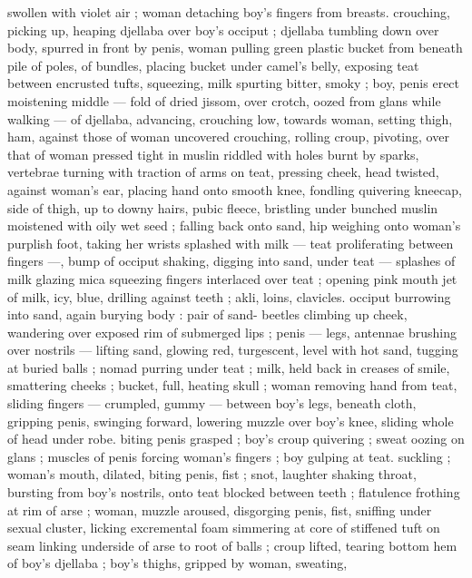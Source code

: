 swollen with violet air ; woman detaching boy's fingers from breasts. 
crouching, picking up, heaping djellaba over boy's occiput ; djellaba 
tumbling down over body, spurred in front by penis, woman pulling 
green plastic bucket from beneath pile of poles, of bundles, placing 
bucket under camel's belly, exposing teat between encrusted tufts, 
squeezing, milk spurting bitter, smoky ; boy, penis erect moistening 
middle --- fold of dried jissom, over crotch, oozed from glans while 
walking --- of djellaba, advancing, crouching low, towards woman, 
setting thigh, ham, against those of woman uncovered crouching, 
rolling croup, pivoting, over that of woman pressed tight in muslin 
riddled with holes burnt by sparks, vertebrae turning with traction of 
arms on teat, pressing cheek, head twisted, against woman's ear, 
placing hand onto smooth knee, fondling quivering kneecap, side of 
thigh, up to downy hairs, pubic fleece, bristling under bunched 
muslin moistened with oily wet seed ; falling back onto sand, hip 
weighing onto woman's purplish foot, taking her wrists splashed with 
milk --- teat proliferating between fingers ---, bump of occiput 
shaking, digging into sand, under teat --- splashes of milk glazing 
mica {\dashcom} squeezing fingers interlaced over teat ; opening pink mouth 
{\col} jet of milk, icy, blue, drilling against teeth ; akli, loins, clavicles. 
occiput burrowing into sand, again burying body : pair of sand- 
beetles climbing up cheek, wandering over exposed rim of 
submerged lips ; penis --- legs, antennae brushing over nostrils --- 
lifting sand, glowing red, turgescent, level with hot sand, tugging at 
buried balls ; nomad purring under teat ; milk, held back in creases 
of smile, smattering cheeks ; bucket, full, heating skull ; woman 
removing hand from teat, sliding fingers --- crumpled, gummy --- 
between boy's legs, beneath cloth, gripping penis, swinging forward, 
lowering muzzle over boy's knee, sliding whole of head under robe. 
biting penis grasped ; boy's croup quivering ; sweat oozing on glans 
; muscles of penis forcing woman's fingers ; boy gulping at teat. 
suckling ; woman's mouth, dilated, biting penis, fist ; snot, laughter 
shaking throat, bursting from boy's nostrils, onto teat blocked 
between teeth ; flatulence frothing at rim of arse ; woman, muzzle 
aroused, disgorging penis, fist, sniffing under sexual cluster, licking 
excremental foam simmering at core of stiffened tuft on seam linking 
underside of arse to root of balls ; croup lifted, tearing bottom hem 
of boy's djellaba ; boy's thighs, gripped by woman, sweating, 
